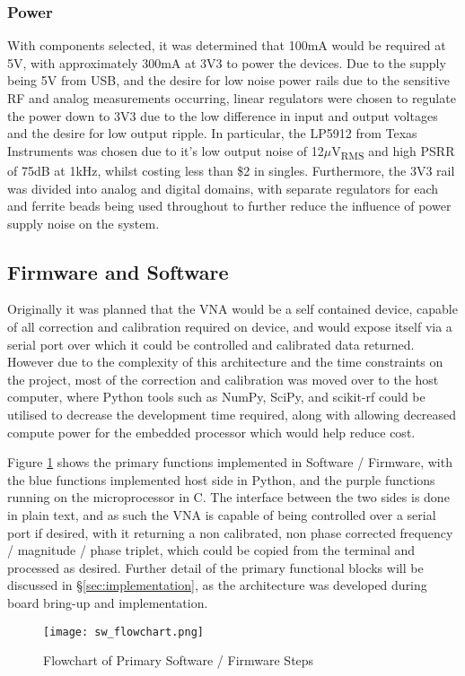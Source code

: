 \subsubsection{Power}
With components selected, it was determined that 100mA would be required at 5V, with approximately 300mA at 3V3 to power the devices. Due to the supply being 5V from USB, and the desire for low noise power rails due to the sensitive RF and analog measurements occurring, linear regulators were chosen to regulate the power down to 3V3 due to the low difference in input and output voltages and the desire for low output ripple. In particular, the LP5912 from Texas Instruments was chosen due to it's low output noise of 12$\mu$V\textsubscript{RMS} and high PSRR of 75dB at 1kHz, whilst costing less than \$2 in singles. Furthermore, the 3V3 rail was divided into analog and digital domains, with separate regulators for each and ferrite beads being used throughout to further reduce the influence of power supply noise on the system. 

\subsection{Firmware and Software}
\label{subsec:firmware_software}
Originally it was planned that the VNA would be a self contained device, capable of all correction and calibration required on device, and would expose itself via a serial port over which it could be controlled and calibrated data returned. However due to the complexity of this architecture and the time constraints on the project, most of the correction and calibration was moved over to the host computer, where Python tools such as NumPy, SciPy, and scikit-rf could be utilised to decrease the development time required, along with allowing decreased compute power for the embedded processor which would help reduce cost. 

Figure \ref{fig:sw_flowchart} shows the primary functions implemented in Software / Firmware, with the blue functions implemented host side in Python, and the purple functions running on the microprocessor in C. The interface between the two sides is done in plain text, and as such the VNA is capable of being controlled over a serial port if desired, with it returning a non calibrated, non phase corrected frequency / magnitude / phase triplet, which could be copied from the terminal and processed as desired. Further detail of the primary functional blocks will be discussed in \S \ref{sec:implementation}, as the architecture was developed during board bring-up and implementation. 

\begin{landscape}
	\begin{figure}[H]
		\centering
		\texttt{[image: sw\_flowchart.png]}
		\caption{Flowchart of Primary Software / Firmware Steps}
		\label{fig:sw_flowchart}
	\end{figure}
\end{landscape}